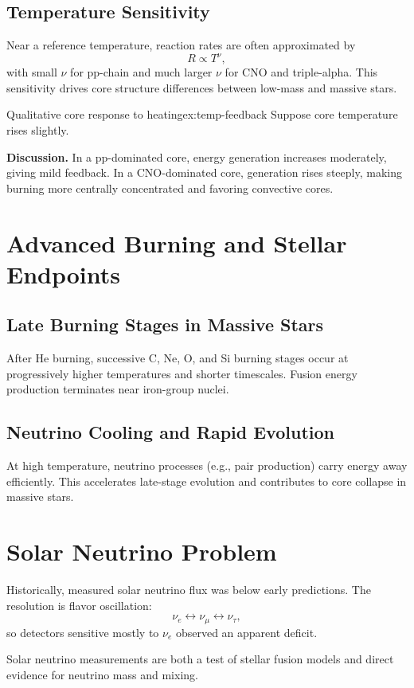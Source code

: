 \subsection{Temperature Sensitivity}
\begin{theory}
Near a reference temperature, reaction rates are often approximated by
\begin{equation}
    R\propto T^{\nu},
\end{equation}
with small $\nu$ for pp-chain and much larger $\nu$ for CNO and triple-alpha.
This sensitivity drives core structure differences between low-mass and massive stars.
\end{theory}

\begin{example}{Qualitative core response to heating}{ex:temp-feedback}
Suppose core temperature rises slightly.

\smallskip\textbf{Discussion.}
In a pp-dominated core, energy generation increases moderately, giving mild feedback.
In a CNO-dominated core, generation rises steeply, making burning more centrally concentrated and favoring convective cores.
\end{example}

\section{Advanced Burning and Stellar Endpoints}

\subsection{Late Burning Stages in Massive Stars}
\begin{theory}
After He burning, successive C, Ne, O, and Si burning stages occur at progressively higher temperatures and shorter timescales.
Fusion energy production terminates near iron-group nuclei.
\end{theory}

\subsection{Neutrino Cooling and Rapid Evolution}
\begin{extra}
At high temperature, neutrino processes (e.g., pair production) carry energy away efficiently.
This accelerates late-stage evolution and contributes to core collapse in massive stars.
\end{extra}

\section{Solar Neutrino Problem}
\begin{theory}
Historically, measured solar neutrino flux was below early predictions.
The resolution is flavor oscillation:
\begin{equation}
    \nu_e\leftrightarrow\nu_\mu\leftrightarrow\nu_\tau,
\end{equation}
so detectors sensitive mostly to $\nu_e$ observed an apparent deficit.
\end{theory}

\begin{remark}
Solar neutrino measurements are both a test of stellar fusion models and direct evidence for neutrino mass and mixing.
\end{remark}
